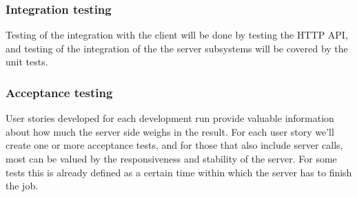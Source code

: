 \subsubsection{Integration testing}
Testing of the integration with the client will be done by testing the HTTP API, and testing of the integration of the the server subsystems will be covered by the unit tests.

\subsubsection{Acceptance testing}
User stories developed for each development run provide valuable information about how much the server side weighs in the result. For each user story we'll create one or more acceptance tests, and for those that also include server calls, most can be valued by the responsiveness and stability of the server. For some tests this is already defined as a certain time within which the server has to finish the job.
